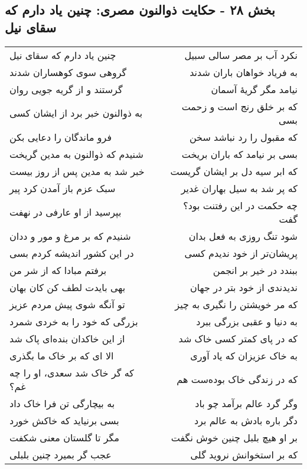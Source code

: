 \begin{center}
\section*{بخش ۲۸ - حکایت ذوالنون مصری: چنین یاد دارم که سقای نیل}
\label{sec:028}
\begin{longtable}{l p{0.5cm} r}
چنین یاد دارم که سقای نیل
&&
نکرد آب بر مصر سالی سبیل
\\
گروهی سوی کوهساران شدند
&&
به فریاد خواهان باران شدند
\\
گرستند و از گریه جویی روان
&&
نیامد مگر گریهٔ آسمان
\\
به ذوالنون خبر برد از ایشان کسی
&&
که بر خلق رنج است و زحمت بسی
\\
فرو ماندگان را دعایی بکن
&&
که مقبول را رد نباشد سخن
\\
شنیدم که ذوالنون به مدین گریخت
&&
بسی بر نیامد که باران بریخت
\\
خبر شد به مدین پس از روز بیست
&&
که ابر سیه دل بر ایشان گریست
\\
سبک عزم باز آمدن کرد پیر
&&
که پر شد به سیل بهاران غدیر
\\
بپرسید از او عارفی در نهفت
&&
چه حکمت در این رفتنت بود؟ گفت
\\
شنیدم که بر مرغ و مور و ددان
&&
شود تنگ روزی به فعل بدان
\\
در این کشور اندیشه کردم بسی
&&
پریشان‌تر از خود ندیدم کسی
\\
برفتم مبادا که از شر من
&&
ببندد در خیر بر انجمن
\\
بهی بایدت لطف کن کان بهان
&&
ندیدندی از خود بتر در جهان
\\
تو آنگه شوی پیش مردم عزیز
&&
که مر خویشتن را نگیری به چیز
\\
بزرگی که خود را به خردی شمرد
&&
به دنیا و عقبی بزرگی ببرد
\\
از این خاکدان بنده‌ای پاک شد
&&
که در پای کمتر کسی خاک شد
\\
الا ای که بر خاک ما بگذری
&&
به خاک عزیزان که یاد آوری
\\
که گر خاک شد سعدی، او را چه غم؟
&&
که در زندگی خاک بوده‌ست هم
\\
به بیچارگی تن فرا خاک داد
&&
وگر گرد عالم برآمد چو باد
\\
بسی برنیاید که خاکش خورد
&&
دگر باره بادش به عالم برد
\\
مگر تا گلستان معنی شکفت
&&
بر او هیچ بلبل چنین خوش نگفت
\\
عجب گر بمیرد چنین بلبلی
&&
که بر استخوانش نروید گلی
\\
\end{longtable}
\end{center}

